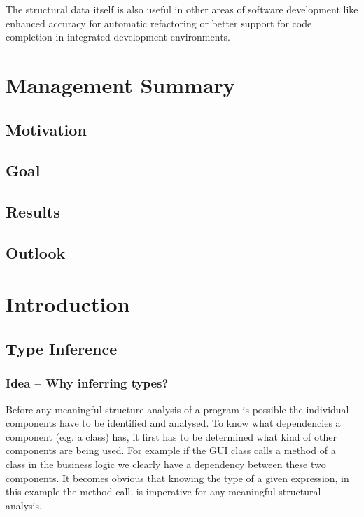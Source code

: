 \documentclass[12pt,halfparskip,DIV11,BCOR10mm]{scrreprt}
\begin{document}
The structural data itself is also useful in other areas of software development like enhanced accuracy for automatic refactoring or better support for code completion in integrated development environments.



\chapter*{Management Summary}

\section*{Motivation}

\section*{Goal}

\section*{Results}

\section*{Outlook}


\newpage

\tableofcontents

\newpage
{}
\pagestyle{scrheadings}

\chapter{Introduction}

\section{Type Inference}

\subsection{Idea – Why inferring types?}

Before any meaningful structure analysis of a program is possible the individual components have to be identified and analysed. To know what dependencies a component (e.g. a class) has, it first has to be determined what kind of other components are being used. For example if the GUI class calls a method of a class in the business logic we clearly have a dependency between these two components. It becomes obvious that knowing the type of a given expression, in this example the method call, is imperative for any meaningful structural analysis.
\end{document}
